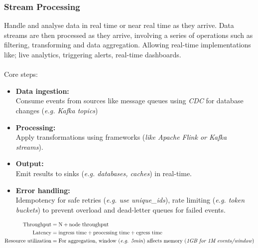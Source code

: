 \documentclass[11pt,a4paper]{article}
\begin{document}
	\subsubsection{Stream Processing}
	Handle and analyse data in real time or near real time as they arrive. Data streams are then processed as they arrive, involving a series of operations such as filtering, transforming and data aggregation. Allowing real-time implementations like; live analytics, triggering alerts, real-time dashboards.\\
	\\Core steps:
	\begin{itemize}
		\item \textbf{Data ingestion:}\\
		Consume events from sources like message queues using \textit{CDC} for database changes (\textit{e.g. Kafka topics})
		\item \textbf{Processing:}\\
		Apply transformations using frameworks (\textit{like Apache Flink or Kafka streams}).
		\item \textbf{Output:}\\
		Emit results to sinks (\textit{e.g. databases, caches}) in real-time.
		\item \textbf{Error handling:}\\
		Idempotency for safe retries (\textit{e.g. use unique\_ids}), rate limiting (\textit{e.g. token buckets}) to prevent overload and dead-letter queues for failed events.
	\end{itemize}
	\begin{flushleft}	
		\[
		\begin{aligned}
			\text{Throughput} &= \text{N} + \text{node throughput} \\
			\text{Latency} &= \text{ingress time} + \text{processing time}  + \text{egress time} \\
			\text{Resource utilization} &= \text{For aggregation, window (\textit{e.g. 5min}) affects memory (\textit{1GB for 1M events/window})}
		\end{aligned}
		\]
	\end{flushleft}
\end{document}

